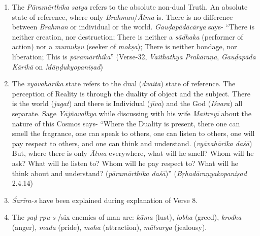 \begin{enumerate}
\item
  The \emph{Pāramārthika satya} refers to the absolute non-dual Truth. An absolute state of reference, where only \emph{Brahman}/\emph{Ātma} is. There is no difference between \emph{Brahman} or individual or the world. \emph{Gauḍapādācārya} says- ``There is neither creation, nor destruction; There is neither a \emph{sādhaka} (performer of action) nor a \emph{mumukṣu} (seeker of \emph{mokṣa}); There is neither bondage, nor liberation; This is \emph{pāramārthika}'' (Verse-32, \emph{Vaithathya Prakāraṇa}, \emph{Gauḍapāda Kārikā} on \emph{Māṇḍukyopaniṣad})
\item
  The \emph{vyāvahārika} state refers to the dual (\emph{dvaita}) state of reference. The perception of Reality is through the duality of object and the subject. There is the world (\emph{jagat}) and there is Individual (\emph{jīva}) and the God (\emph{Iśvara}) all separate. Sage \emph{Yājñavalkya} while discussing with his wife \emph{Maitreyī} about the nature of this Cosmos says- ``Where the Duality is present, there one can smell the fragrance, one can speak to others, one can listen to others, one will pay respect to others, and one can think and understand. (\emph{vyāvahārika daśā}) But, where there is only \emph{Ātma} everywhere, what will he smell? Whom will he ask? What will he listen to? Whom will he pay respect to? What will he think about and understand? (\emph{pāramārthika daśā})'' (\emph{Bṛhadāraṇyakopaniṣad} 2.4.14)
\item
  \emph{Śarīra-s} have been explained during explanation of Verse 8.
\item
  The \emph{ṣaḍ ṛpu-s} /six enemies of man are: \emph{kāma} (lust), \emph{lobha} (greed), \emph{krodha} (anger), \emph{mada} (pride), \emph{moha} (attraction), \emph{mātsarya} (jealousy).
\end{enumerate}
